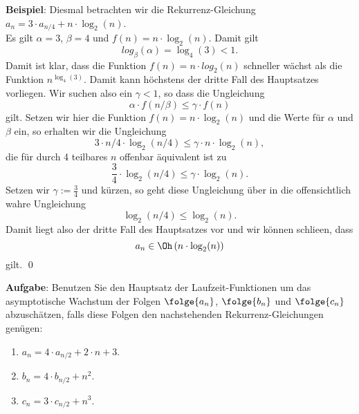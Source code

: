 \noindent
\textbf{Beispiel}:
Diesmal betrachten  wir die Rekurrenz-Gleichung 
\\[0.2cm]
\hspace*{1.3cm}
$a_n = 3 \cdot a_{n/4} + n \cdot \log_2(n)$.
\\[0.2cm]
Es gilt $\alpha = 3$, $\beta = 4$ und $f(n) = n \cdot \log_2(n)$.  Damit gilt
\[ log_\beta(\alpha) = \log_4(3) < 1. \]
Damit ist klar, dass die Funktion $f(n) = n \cdot log_2(n)$ schneller w\"achst als die
Funktion $n^{\log_4(3)}$.  Damit kann h\"ochstens der dritte Fall des Hauptsatzes vorliegen.
Wir suchen also ein $\gamma < 1$, so dass die Ungleichung
\[ \alpha \cdot f(n/\beta) \leq \gamma \cdot f(n) \]
gilt.  Setzen wir hier die Funktion $f(n) = n \cdot \log_2(n)$ und die Werte f\"ur $\alpha$
und $\beta$ ein, so erhalten wir die Ungleichung 
\[ 3 \cdot n/4 \cdot \log_2(n/4) \leq \gamma \cdot n \cdot \log_2(n), \]
die f\"ur durch 4 teilbares $n$ offenbar \"aquivalent ist zu
\[ \frac{3}{4} \cdot \log_2(n/4) \leq \gamma \cdot \log_2(n). \]
Setzen wir $\gamma := \frac{3}{4}$ und k\"urzen, so geht diese Ungleichung \"uber in die
offensichtlich wahre Ungleichung
\[ \log_2(n/4) \leq \log_2(n). \] 
Damit liegt also der dritte Fall des Hauptsatzes vor und wir k\"onnen schlie\3en, dass
\[ a_n \in \Oh\left(n \cdot \log_2(n)\right) \]
gilt. \qed
\vspace*{0.3cm}

\noindent
\textbf{Aufgabe}:
Benutzen Sie den Hauptsatz der Laufzeit-Funktionen um das asymptotische Wachstum 
der Folgen $\folge{a_n}$, $\folge{b_n}$ und $\folge{c_n}$  abzusch\"atzen, falls diese
Folgen den nachstehenden Rekurrenz-Gleichungen gen\"ugen:
\begin{enumerate}
\item $a_n = 4 \cdot a_{n/2} + 2 \cdot n + 3$.
\item $b_n = 4 \cdot b_{n/2} + n^2$.
\item $c_n = 3 \cdot c_{n/2} + n^3$.
\end{enumerate}

